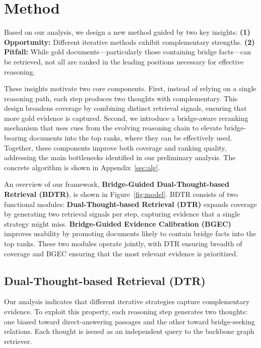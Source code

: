 \documentclass{article} %
\begin{document}
\section{Method}


Based on our analysis, we design a new method guided by two key insights:  
{\bf (1) Opportunity:} Different iterative methods exhibit complementary strengths.  
{\bf (2) Pitfall:} While gold documents—particularly those containing bridge facts—can be retrieved, not all are ranked in the leading positions necessary for effective reasoning. 

These insights motivate two core components.
First, instead of relying on a single reasoning path, each step produces two  thoughts with complementary. This design broadens coverage by combining distinct retrieval signals, ensuring that more gold evidence is captured.  
Second, we introduce a bridge-aware reranking mechanism that uses cues from the evolving reasoning chain to elevate bridge-bearing documents into the top ranks, where they can be effectively used.  
Together, these components improve both coverage and ranking quality, addressing the main bottlenecks identified in our preliminary analysis. The concrete algorithm is shown in Appendix~\ref{sec:alg}.

An overview of our framework, {\bf Bridge-Guided Dual-Thought-based Retrieval (BDTR)}, is shown in Figure~\ref{fig:model}. 
BDTR consists of two functional modules:  
{\bf Dual-Thought-based Retrieval (DTR)} expands coverage by generating two retrieval signals per step, capturing evidence that a single strategy might miss.  
{\bf Bridge-Guided Evidence Calibration (BGEC)} improves usability by promoting documents likely to contain bridge facts into the top ranks.  
These two modules operate jointly, with DTR ensuring breadth of coverage and BGEC ensuring that the most relevant evidence is prioritized.

  

\subsection{Dual-Thought-based Retrieval (DTR)}

Our analysis indicates that different iterative strategies capture complementary evidence.  
To exploit this property, each reasoning step generates two thoughts: one biased toward direct-answering passages and the other toward bridge-seeking relations.  
Each thought is issued as an independent query to the backbone graph retriever.
\end{document}
